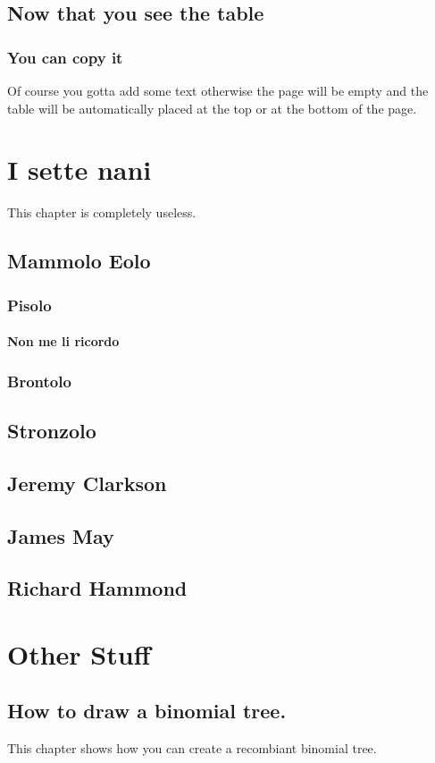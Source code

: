 \documentclass[12pt]{book}
\begin{document}
\section{Now that you see the table}
\subsection{You can copy it}
Of course you gotta add some text otherwise the page will be empty and the table will be automatically placed at the top or at the bottom of the page.

\chapter{I sette nani}

This chapter is completely useless.
\section{Mammolo Eolo}
\subsection{Pisolo}
\subsubsection{Non me li ricordo}
\subsection{Brontolo}
\section{Stronzolo}
\section{Jeremy Clarkson}
\section{James May}
\section{Richard Hammond}

\chapter{Other Stuff}

\section{How to draw a binomial tree.}
This chapter shows how you can create a recombiant binomial tree. 
\end{document}
